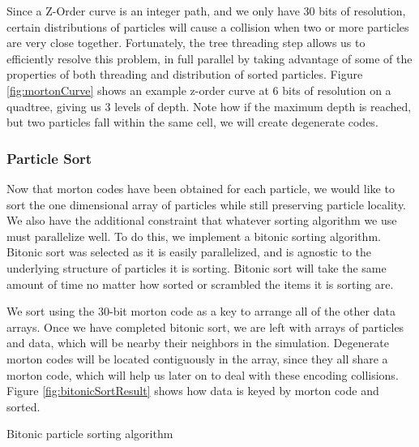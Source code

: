 \documentclass{thesis}
\begin{document}
Since a Z-Order curve is an integer path, and we only have 30 bits of resolution, certain distributions of particles will cause a collision when two or more particles are very close together. Fortunately, the tree threading step allows us to efficiently resolve this problem, in full parallel by taking advantage of some of the properties of both threading and distribution of sorted particles. Figure \ref{fig:mortonCurve} shows an example z-order curve at 6 bits of resolution on a quadtree, giving us 3 levels of depth. Note how if the maximum depth is reached, but two particles fall within the same cell, we will create degenerate codes.


\subsubsection{Particle Sort}
Now that morton codes have been obtained for each particle, we would like to sort the one dimensional array of particles while still preserving particle locality. We also have the additional constraint that whatever sorting algorithm we use must parallelize well. To do this, we implement a bitonic sorting algorithm. Bitonic sort was selected as it is easily parallelized, and is agnostic to the underlying structure of particles it is sorting. Bitonic sort will take the same amount of time no matter how sorted or scrambled the items it is sorting are.

We sort using the 30-bit morton code as a key to arrange all of the other data arrays. Once we have completed bitonic sort, we are left with arrays of particles and data, which will be nearby their neighbors in the simulation. Degenerate morton codes will be located contiguously in the array, since they all share a morton code, which will help us later on to deal with these encoding collisions. Figure \ref{fig:bitonicSortResult} shows how data is keyed by morton code and sorted.

\begin{algorithm}
    \label{alg:BitonicParticleSort}
    \caption{Bitonic particle sorting algorithm}
    \begin{algorithmic}
        \EndFor
    \end{algorithmic}
\end{algorithm}

\end{document}
